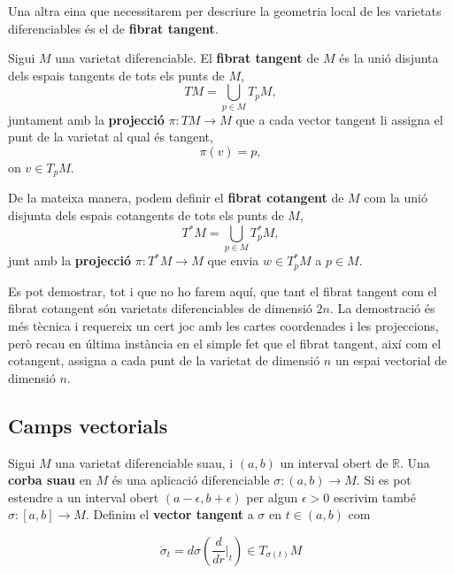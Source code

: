 Una altra eina que necessitarem per descriure la geometria local de les varietats diferenciables és el de \textbf{fibrat tangent}.
\begin{defi}
    Sigui $M$ una varietat diferenciable. El \textbf{fibrat tangent} de $M$ és la unió disjunta dels espais tangents de tots els punts de $M$, 
    \begin{equation*}
        TM = \bigcup_{p\in M} T_pM,
    \end{equation*}
    juntament amb la \textbf{projecció} $\pi:TM\to M$ que a cada vector tangent li assigna el punt de la varietat al qual és tangent,
    \begin{equation*}
        \pi(v) = p,
    \end{equation*}
    on $v\in T_pM$.
\end{defi}
De la mateixa manera, podem definir el \textbf{fibrat cotangent} de $M$ com la unió disjunta dels espais cotangents de tots els punts de $M$,
\begin{equation*}
    T^*M = \bigcup_{p\in M} T^*_pM,
\end{equation*}
junt amb la \textbf{projecció} $\pi:T^*M\to M$ que envia $w\in T^*_pM$ a $p\in M$.

Es pot demostrar, tot i que no ho farem aquí, que tant el fibrat tangent com el fibrat cotangent són varietats diferenciables de dimensió $2n$. La demostració és més tècnica i requereix un cert joc amb les cartes coordenades i les projeccions, però recau en última instància en el simple fet que el fibrat tangent, així com el cotangent, assigna a cada punt de la varietat de dimensió $n$ un espai vectorial de dimensió $n$.

\subsection{Camps vectorials}
\begin{defi}
    Sigui $M$ una varietat diferenciable suau, i $(a,b)$ un interval obert de $\mathbb R$. Una \textbf{corba suau} en $M$ és una aplicació diferenciable $\sigma:(a,b)\to M$. Si es pot estendre a un interval obert $(a-\epsilon,b+\epsilon)$ per algun $\epsilon>0$ escrivim també $\sigma:[a,b]\to M$. Definim el \textbf{vector tangent} a $\sigma$ en $t\in(a,b)$ com

    \begin{equation*}
        \dot{\sigma}_t = d\sigma\left(\frac{d}{dr}\Big|_{t}\right)\in T_{\sigma(t)}M
    \end{equation*}
\end{defi}

